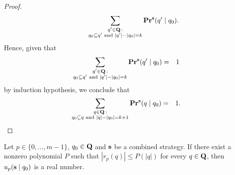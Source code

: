 \begin{proof}
\begin{align*}
&\hspace{30pt}\sum_{\substack{q' \in \mathbf{Q} \,: \\ q_0 \subseteq q' \text{ {\rm and} } |q'| - |q_0| = k}}
\mathbf{Pr}^{\mathbf{s}}(q' \mid q_0).
\end{align*}
Hence, given that
\begin{eqnarray*}
\sum_{\substack{q' \in \mathbf{Q} \,: \\ q_0 \subseteq q' \text{ {\rm and} } |q'| - |q_0| = k}}
\mathbf{Pr}^{\mathbf{s}}(q' \mid q_0) & = & 1
\end{eqnarray*}
by induction hypothesis, we conclude that
\begin{eqnarray*}
\sum_{\substack{q \in \mathbf{Q} \,: \\ q_0 \subseteq q \text{ {\rm and} } |q| - |q_0| = k+1}}
\mathbf{Pr}^{\mathbf{s}}(q \mid q_0) & = & 1.
\end{eqnarray*}
\end{proof}

\begin{myprop}\label{prop-conv}
Let $p \in \{0, \ldots, m-1\}$, $q_0 \in \mathbf{Q}$ and $\mathbf{s}$ be a combined strategy. If there exist a nonzero polynomial $P$ such that $|r_p(q)| \leq P(|q|)$ for every $q \in \mathbf{Q}$, then $u_p(\mathbf{s} \mid q_0)$ is a real number.
\end{myprop}

